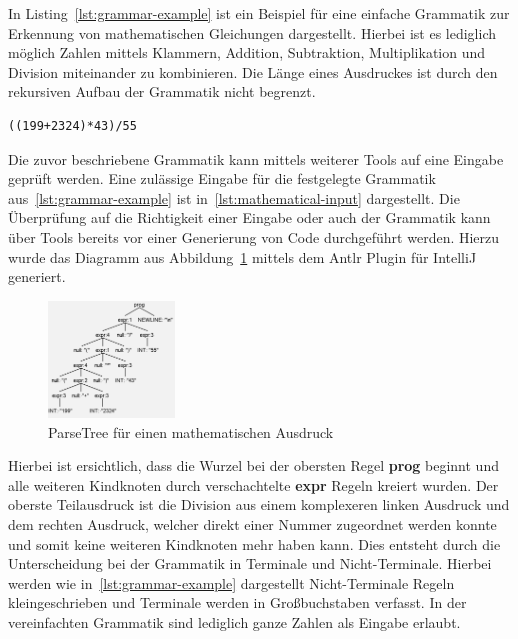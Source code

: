 

In Listing~\ref{lst:grammar-example} ist ein Beispiel für eine einfache Grammatik zur Erkennung von mathematischen Gleichungen dargestellt.\cite{antlrOrg}
Hierbei ist es lediglich möglich Zahlen mittels Klammern, Addition, Subtraktion, Multiplikation und Division miteinander zu kombinieren.
Die Länge eines Ausdruckes ist durch den rekursiven Aufbau der Grammatik nicht begrenzt.

\begin{lstlisting}[caption={Einfacher mathematischer Ausdruck},label={lst:mathematical-input}]
    ((199+2324)*43)/55

\end{lstlisting}

Die zuvor beschriebene Grammatik kann mittels weiterer Tools auf eine Eingabe geprüft werden.
Eine zulässige Eingabe für die festgelegte Grammatik aus~\ref{lst:grammar-example} ist in~\ref{lst:mathematical-input} dargestellt.
Die Überprüfung auf die Richtigkeit einer Eingabe oder auch der Grammatik kann über Tools bereits vor einer Generierung von Code durchgeführt werden.
Hierzu wurde das Diagramm aus Abbildung~\ref{fig:parse-example} mittels dem Antlr Plugin für IntelliJ generiert.

\begin{figure}[h]
    \centering
    \includegraphics[width=0.3\textwidth]{images/parseTreeExample}
    \caption{ParseTree für einen mathematischen Ausdruck}
    \label{fig:parse-example}
\end{figure}

Hierbei ist ersichtlich, dass die Wurzel bei der obersten Regel \textbf{prog} beginnt und alle weiteren Kindknoten durch verschachtelte \textbf{expr} Regeln kreiert wurden.
Der oberste Teilausdruck ist die Division aus einem komplexeren linken Ausdruck und dem rechten Ausdruck, welcher direkt einer Nummer zugeordnet werden konnte und somit keine weiteren Kindknoten mehr haben kann.
Dies entsteht durch die Unterscheidung bei der Grammatik in Terminale und Nicht-Terminale.
Hierbei werden wie in~\ref{lst:grammar-example} dargestellt Nicht-Terminale Regeln kleingeschrieben und Terminale werden in Großbuchstaben verfasst.
In der vereinfachten Grammatik sind lediglich ganze Zahlen als Eingabe erlaubt.

